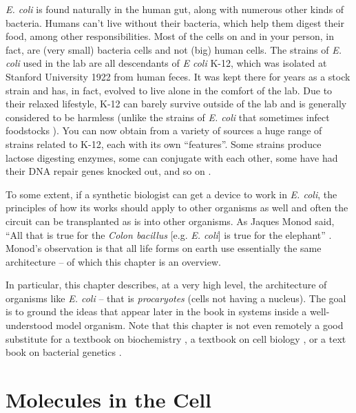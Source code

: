 {\em E. coli} is found naturally in the human gut, along with numerous
other kinds of bacteria. Humans can't live without their bacteria,
which help them digest their food, among other responsibilities. Most
of the cells on and in your person, in fact, are (very small) bacteria
cells and not (big) human cells. The strains of {\em E. coli} used in
the lab are all descendants of {\em E coli} K-12, which was isolated
at Stanford University 1922 from human feces. It was kept there for
years as a stock strain and has, in fact, evolved to live alone in the
comfort of the lab. Due to their relaxed lifestyle, K-12 can barely
survive outside of the lab and is generally considered to be harmless
(unlike the strains of {\em E. coli} that sometimes infect foodstocks
\cite{taco-bell}). You can now obtain from a variety of sources a huge
range of strains related to K-12, each with its own ``features''. Some
strains produce lactose digesting enzymes, some can conjugate with each
other, some have had their DNA repair genes knocked out, and so on
\cite{cgsc}.

To some extent, if a synthetic biologist can get a device to work in
{\em E. coli}, the principles of how its works should apply to other
organisms as well and often the circuit can be transplanted as is into
other organisms. As Jaques Monod said, ``All that is true for the {\em
  Colon bacillus} [e.g. {\em E. coli}] is true for the elephant''
\cite{monod}. Monod's observation is that all life forms on earth use
essentially the same architecture -- of which this chapter is an
overview.

In particular, this chapter describes, at a very high level, the
architecture of organisms like {\em E. coli} -- that is {\em
  procaryotes} (cells not having a nucleus). The goal is to ground the
ideas that appear later in the book in systems inside a
well-understood model organism. Note that this chapter is not even
remotely a good substitute for a textbook on biochemistry
\cite{nelson-cox}, a textbook on cell biology \cite{thecell}, or a
text book on bacterial genetics \cite{bact-genetics}.

\section{Molecules in the Cell}

